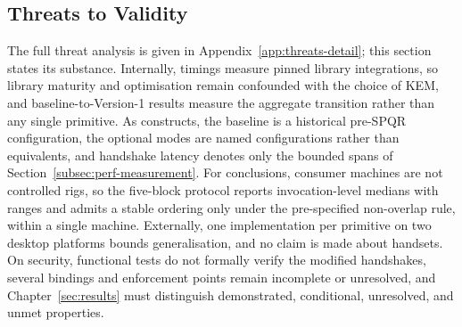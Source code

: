 \subsection{Threats to Validity}
\label{subsec:threats-validity}

The full threat analysis is given in Appendix~\ref{app:threats-detail}; this section states its substance. Internally, timings measure pinned library integrations, so library maturity and optimisation remain confounded with the choice of KEM, and baseline-to-Version-1 results measure the aggregate transition rather than any single primitive. As constructs, the baseline is a historical pre-SPQR configuration, the optional modes are named configurations rather than equivalents, and handshake latency denotes only the bounded spans of Section~\ref{subsec:perf-measurement}. For conclusions, consumer machines are not controlled rigs, so the five-block protocol reports invocation-level medians with ranges and admits a stable ordering only under the pre-specified non-overlap rule, within a single machine. Externally, one implementation per primitive on two desktop platforms bounds generalisation, and no claim is made about handsets. On security, functional tests do not formally verify the modified handshakes, several bindings and enforcement points remain incomplete or unresolved, and Chapter~\ref{sec:results} must distinguish demonstrated, conditional, unresolved, and unmet properties.
